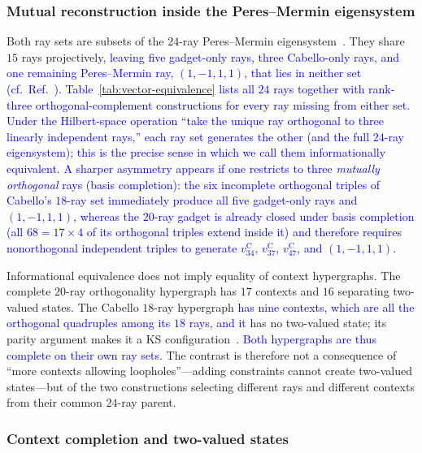 \documentclass[%
  reprint,
  superscriptaddress,
  showkeys,
  amsmath,amssymb,
  aps,pra,
  longbibliography,
  floatfix,
  x11names
]{revtex4-2}
\DeclareRobustCommand{\chg}[1]{\textcolor{blue}{#1}}
\begin{document}
\subsubsection{Mutual reconstruction inside the Peres--Mermin eigensystem}

Both ray sets are subsets of the $24$-ray Peres--Mermin eigensystem~\chg{\cite{pavicic-2004ksafq,svozil-2024-convert-pra-externalfigures,2024-cabello-trandafir0}}.  They share $15$ rays projectively\chg{, leaving five gadget-only rays, three Cabello-only rays, and one remaining Peres--Mermin ray, $(1,-1,1,1)$, that lies in neither set (cf.\ Ref.~\cite[Table~III]{2024-cabello-trandafir0}).  Table~\ref{tab:vector-equivalence} lists all $24$ rays together with rank-three orthogonal-complement constructions for every ray missing from either set.  Under the Hilbert-space operation ``take the unique ray orthogonal to three linearly independent rays,'' each ray set generates the other (and the full $24$-ray eigensystem); this is the precise sense in which we call them informationally equivalent.  A sharper asymmetry appears if one restricts to three \emph{mutually orthogonal} rays (basis completion): the six incomplete orthogonal triples of Cabello's $18$-ray set immediately produce all five gadget-only rays and $(1,-1,1,1)$, whereas the $20$-ray gadget is already closed under basis completion (all $68=17\times 4$ of its orthogonal triples extend inside it) and therefore requires nonorthogonal independent triples to generate $v^{\mathrm{C}}_{34}$, $v^{\mathrm{C}}_{37}$, $v^{\mathrm{C}}_{47}$, and $(1,-1,1,1)$.}

Informational equivalence does not imply equality of context hypergraphs.  The complete $20$-ray orthogonality hypergraph has $17$ contexts and $16$ separating two-valued states.  The Cabello $18$-ray hypergraph \chg{has nine contexts, which are all the orthogonal quadruples among its $18$ rays, and it} has no two-valued state; its parity argument makes it a KS configuration~\cite{cabello-96}.  \chg{Both hypergraphs are thus complete on their own ray sets.}  The contrast is therefore not a consequence of ``more contexts allowing loopholes''---adding constraints cannot create two-valued states---but of the two constructions selecting different rays and different contexts from their common $24$-ray parent.

\subsubsection{Context completion and two-valued states}
\end{document}

